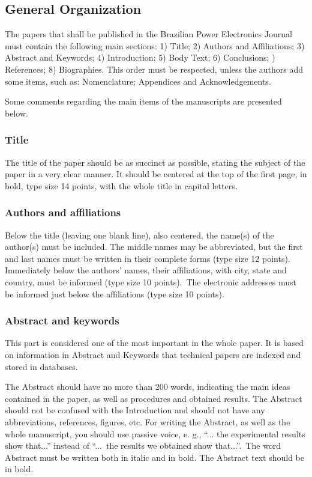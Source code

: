 \documentclass[english]{sobraep}
\begin{document}
\subsection{General Organization}

The papers that shall be published in the Brazilian Power Electronics Journal must contain the following main sections:
1) Title; 2) Authors and Affiliations; 3) Abstract and Keywords; 4) Introduction; 5) Body Text; 6) Conclusions; ) References; 8) Biographies. This order must be respected, unless the authors add some items, such as: Nomenclature; Appendices and Acknowledgements.

Some comments regarding the main items of the manuscripts are presented below.

\subsubsection{Title}

The title of the paper should be as succinct as possible, stating the subject of the paper in a very clear manner. It should be centered at the top of the first page, in bold, type size 14 points, with the whole title in capital letters.

\subsubsection{Authors and affiliations}

Below the title (leaving one blank line), also centered, the name(s) of the author(s) must be included. The middle names may be abbreviated, but the first and last names must be written in their complete forms (type size 12 points). Immediately below the authors' names, their affiliations, with city, state and country, must be informed (type size 10 points).~The electronic addresses must be informed just below the affiliations (type size 10 points).

\subsubsection{Abstract and keywords}

This part is considered one of the most important in the whole paper. It is based on information in Abstract and Keywords that technical papers are indexed and stored in databases.

The Abstract should have no more than 200 words, indicating the main ideas contained in the paper, as well as procedures and obtained results. The Abstract should not be confused with the Introduction and should not have any abbreviations, references, figures, etc. For writing the Abstract, as well as the whole manuscript, you should use passive voice, e. g.,  ``... the experimental results show that...'' instead of ``...~the results we obtained show that...''.~The word Abstract must be written both in italic and in bold. The Abstract text should be in bold.
\end{document}
